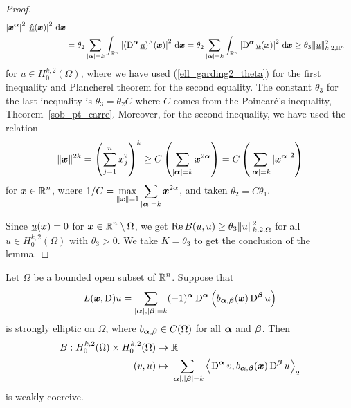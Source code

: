\begin{proof}
\begin{align*}
\left| {\bm{x}}^{{\bm{\alpha}}} \right|^2 
\left| \hat{\underline{u}}({\bm{x}}) \right|^2 \,\mathrm{d}{{\bm{x}}} \\
&= \theta_2 \sum_{|{\bm{\alpha}}|=k} \int_{\mathbb{R}^n} \left|
(\operatorname{D}^{{\bm{\alpha}}} \underline{u})^\wedge ({\bm{x}}) \right|^2 \,\mathrm{d}{{\bm{x}}} 
= \theta_2 \sum_{|{\bm{\alpha}}|=k} \int_{\mathbb{R}^n}
\left| \operatorname{D}^{{\bm{\alpha}}} \underline{u}({\bm{x}}) \right|^2 \,\mathrm{d}{{\bm{x}}}
\geq \theta_3 \| \underline{u} \|_{k,2,\mathbb{R}^n}^2             
\end{align*}
for $\displaystyle u \in H^{k,2}_0(\Omega)$, where
we have used (\ref{ell_garding2_theta}) for the first inequality and
Plancherel theorem for the second equality.  The constant $\theta_3$
for the last inequality is $\theta_3 = \theta_2 C$ where $C$ comes
from the Poincaré's inequality, Theorem~\ref{sob_pt_carre}.
Moreover, for the second inequality, we have used the relation
\[
\| {\bm{x}} \|^{2k} = \left( \sum_{j=1}^n x_j^2 \right)^{k}
\geq C \left( \sum_{|{\bm{\alpha}}|=k} {\bm{x}}^{2{\bm{\alpha}}} \right)
= C \left( \sum_{|{\bm{\alpha}}|=k} \left|{\bm{x}}^{{\bm{\alpha}}}\right|^2 \right)
\]
for $\displaystyle {\bm{x}} \in \mathbb{R}^n$,
where $\displaystyle 1/C = \max_{\|{\bm{x}}\|=1}
\sum_{|{\bm{\alpha}}|=k} {\bm{x}}^{2\alpha}$,
and taken $\theta_2 = C \theta_1$.

Since $\underline{u}({\bm{x}}) = 0$ for
$\displaystyle {\bm{x}} \in \mathbb{R}^n \setminus \Omega$, we get
$\displaystyle \operatorname{Re} B(u,u) \geq \theta_3 \|u\|_{k,2,\Omega}^2$ for all
$\displaystyle u \in H^{k,2}_0(\Omega)$ with $\theta_3>0$.  We take
$K=\theta_3$ to get the conclusion of the lemma.
\end{proof}

\begin{lemma} \label{ell_garding3}
Let $\Omega$ be a bounded open subset of $\displaystyle \mathbb{R}^n$.  Suppose that
\[
L({\bm{x}},\operatorname{D})u = \sum_{|{\bm{\alpha}}|,|{\bm{\beta}}|= k}
(-1)^{{\bm{\alpha}}} \operatorname{D}^{{\bm{\alpha}}}
\left( b_{{\bm{\alpha}},{\bm{\beta}}}({\bm{x}}) \operatorname{D}^{{\bm{\beta}}} u\right)
\]
is strongly elliptic on $\overline{\Omega}$, where
$b_{{\bm{\alpha}},{\bm{\beta}}} \in C(\overline{\Omega})$ for all
${\bm{\alpha}}$ and ${\bm{\beta}}$.  Then
\[
\begin{split}
B : H^{k,2}_0(\Omega) \times H^{k,2}_0(\Omega) & \rightarrow \mathbb{R} \\
(v,u) &\mapsto
\sum_{|{\bm{\alpha}}|,|{\bm{\beta}}|= k}
\left\langle{\operatorname{D}^{{\bm{\alpha}}} v} , {b_{{\bm{\alpha}},{\bm{\beta}}}({\bm{x}})
\operatorname{D}^{{\bm{\beta}}} u}\right\rangle_2
\end{split}
\]
is weakly coercive.
\end{lemma}

